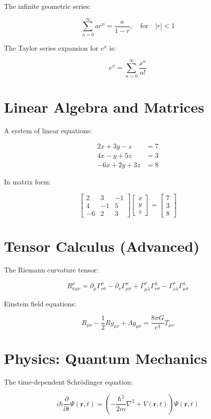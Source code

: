 \documentclass{article}
\begin{document}
The infinite geometric series:

\[
\sum_{n=0}^{\infty} ar^n = \frac{a}{1-r}, \quad \text{for} \quad |r| < 1
\]

The Taylor series expansion for \( e^x \) is:

\[
e^x = \sum_{n=0}^{\infty} \frac{x^n}{n!}
\]

\section{Linear Algebra and Matrices}

A system of linear equations:

\[
\begin{aligned}
2x + 3y - z &= 7 \\
4x - y + 5z &= 3 \\
-6x + 2y + 3z &= 8
\end{aligned}
\]

In matrix form:

\[
\begin{bmatrix}
2 & 3 & -1 \\
4 & -1 & 5 \\
-6 & 2 & 3
\end{bmatrix}
\begin{bmatrix}
x \\ y \\ z
\end{bmatrix}
=
\begin{bmatrix}
7 \\ 3 \\ 8
\end{bmatrix}
\]

\section{Tensor Calculus (Advanced)}

The Riemann curvature tensor:

\[
R^\rho_{\sigma\mu\nu} = \partial_\mu \Gamma^\rho_{\nu\sigma} - \partial_\nu \Gamma^\rho_{\mu\sigma} + \Gamma^\rho_{\mu\lambda} \Gamma^\lambda_{\nu\sigma} - \Gamma^\rho_{\nu\lambda} \Gamma^\lambda_{\mu\sigma}
\]

Einstein field equations:

\[
R_{\mu\nu} - \frac{1}{2} R g_{\mu\nu} + \Lambda g_{\mu\nu} = \frac{8\pi G}{c^4} T_{\mu\nu}
\]

\section{Physics: Quantum Mechanics}

The time-dependent Schrödinger equation:

\[
i\hbar \frac{\partial}{\partial t} \Psi(\mathbf{r}, t) = \left( -\frac{\hbar^2}{2m} \nabla^2 + V(\mathbf{r}, t) \right) \Psi(\mathbf{r}, t)
\]
\end{document}
